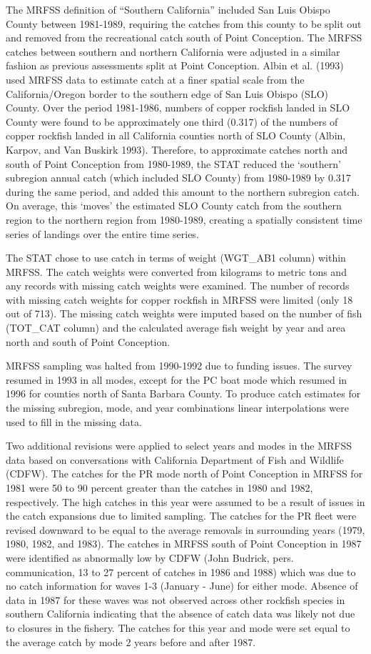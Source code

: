\documentclass[11pt,
  english,
  letterpaper,
]{article}
\begin{document}
The MRFSS definition of ``Southern California'' included San Luis Obispo County between 1981-1989, requiring the catches from this county to be split out and removed from the recreational catch south of Point Conception. The MRFSS catches between southern and northern California were adjusted in a similar fashion as previous assessments split at Point Conception. Albin et al. (1993) used MRFSS data to estimate catch at a finer spatial scale from the California/Oregon border to the southern edge of San Luis Obispo (SLO) County. Over the period 1981-1986, numbers of copper rockfish landed in SLO County were found to be approximately one third (0.317) of the numbers of copper rockfish landed in all California counties north of SLO County (Albin, Karpov, and Van Buskirk 1993). Therefore, to approximate catches north and south of Point Conception from 1980-1989, the STAT reduced the `southern' subregion annual catch (which included SLO County) from 1980-1989 by 0.317 during the same period, and added this amount to the northern subregion catch. On average, this `moves' the estimated SLO County catch from the southern region to the northern region from 1980-1989, creating a spatially consistent time series of landings over the entire time series.

The STAT chose to use catch in terms of weight (WGT\_AB1 column) within MRFSS. The catch weights were converted from kilograms to metric tons and any records with missing catch weights were examined. The number of records with missing catch weights for copper rockfish in MRFSS were limited (only 18 out of 713). The missing catch weights were imputed based on the number of fish (TOT\_CAT column) and the calculated average fish weight by year and area north and south of Point Conception.

MRFSS sampling was halted from 1990-1992 due to funding issues. The survey resumed in 1993 in all modes, except for the PC boat mode which resumed in 1996 for counties north of Santa Barbara County. To produce catch estimates for the missing subregion, mode, and year combinations linear interpolations were used to fill in the missing data.

Two additional revisions were applied to select years and modes in the MRFSS data based on conversations with California Department of Fish and Wildlife (CDFW). The catches for the PR mode north of Point Conception in MRFSS for 1981 were 50 to 90 percent greater than the catches in 1980 and 1982, respectively. The high catches in this year were assumed to be a result of issues in the catch expansions due to limited sampling. The catches for the PR fleet were revised downward to be equal to the average removals in surrounding years (1979, 1980, 1982, and 1983). The catches in MRFSS south of Point Conception in 1987 were identified as abnormally low by CDFW (John Budrick, pers. communication, 13 to 27 percent of catches in 1986 and 1988) which was due to no catch information for waves 1-3 (January - June) for either mode. Absence of data in 1987 for these waves was not observed across other rockfish species in southern California indicating that the absence of catch data was likely not due to closures in the fishery. The catches for this year and mode were set equal to the average catch by mode 2 years before and after 1987.
\end{document}
